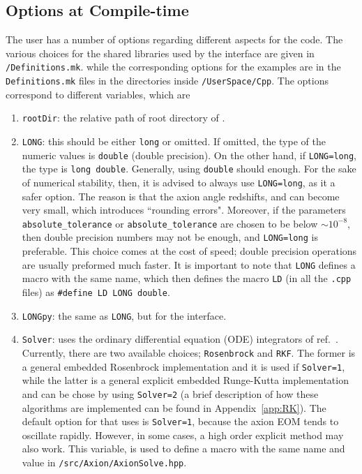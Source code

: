\documentclass[11pt,a4paper]{article}
\begin{document}
\subsection{Options at Compile-time}
%
The user has a number of options regarding different aspects for the code. The various choices for the shared libraries used by the \PY interface are given in {\tt \mimes/Definitions.mk}. while the corresponding options for the \CPP examples are in the {\tt Definitions.mk} files in the directories inside {\tt \mimes/UserSpace/Cpp}.  The options correspond to different variables, which are
%
\begin{enumerate}
	\item {\tt rootDir}: the relative path of root directory of \mimes.  
	\item {\tt LONG}: this should be either {\tt long} or omitted. If omitted, the type of the numeric values is {\tt double} (double precision). On the other hand, if {\tt LONG=long},  the type is  {\tt long double}. Generally, using {\tt double} should enough. For the sake of numerical stability, then, it is advised to always use {\tt LONG=long}, as it a safer option. The reason is that the axion angle redshifts, and can become very small, which introduces ``rounding errors". Moreover, if the parameters {\tt absolute\_tolerance} or {\tt absolute\_tolerance} are chosen to be below $\sim 10^{-8}$, then double precision numbers may not be enough, and {\tt LONG=long} is preferable.  This choice comes at the cost of speed; double precision operations are usually preformed much faster. It is important to note that {\tt LONG} defines a macro with the same name, which then defines the macro {\tt LD} (in all the {\tt .cpp} files) as {\tt \#define LD LONG double}.
	\item {\tt LONGpy}: the same as {\tt LONG}, but for the \PY interface.
	\item {\tt Solver}: \mimes uses the ordinary differential equation (ODE) integrators of ref.~\cite{NaBBODES}. Currently, there are two available choices; {\tt Rosenbrock} and {\tt RKF}. The former is a general embedded Rosenbrock implementation and it is used if {\tt Solver=1}, while the latter is a general explicit embedded Runge-Kutta implementation and can be chose by using {\tt Solver=2} (a brief description of how these algorithms are implemented can be found in Appendix~\ref{app:RK}). The default option for that \mimes uses is {\tt Solver=1}, because the axion EOM tends to oscillate rapidly. However, in some cases, a high order explicit method may also work. This variable, is used to define a macro with the same name and value in {\tt \mimes/src/Axion/AxionSolve.hpp}.

\end{enumerate}
\end{document}
